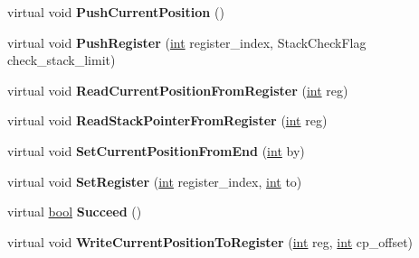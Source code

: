 \begin{DoxyCompactItemize}
virtual void {\bfseries Push\+Current\+Position} ()
\item 
\mbox{\label{classv8_1_1internal_1_1RegExpMacroAssemblerMIPS_a90366ef0b90e87e3abeadd215ac99101}} 
virtual void {\bfseries Push\+Register} (\mbox{\hyperlink{classint}{int}} register\+\_\+index, Stack\+Check\+Flag check\+\_\+stack\+\_\+limit)
\item 
\mbox{\label{classv8_1_1internal_1_1RegExpMacroAssemblerMIPS_a3db856debb66a86b0b999760078fc9e2}} 
virtual void {\bfseries Read\+Current\+Position\+From\+Register} (\mbox{\hyperlink{classint}{int}} reg)
\item 
\mbox{\label{classv8_1_1internal_1_1RegExpMacroAssemblerMIPS_a5f13f6d69555eafd3532f64d2ea443a0}} 
virtual void {\bfseries Read\+Stack\+Pointer\+From\+Register} (\mbox{\hyperlink{classint}{int}} reg)
\item 
\mbox{\label{classv8_1_1internal_1_1RegExpMacroAssemblerMIPS_a005d180b2c2a25be9adada6ceea905c7}} 
virtual void {\bfseries Set\+Current\+Position\+From\+End} (\mbox{\hyperlink{classint}{int}} by)
\item 
\mbox{\label{classv8_1_1internal_1_1RegExpMacroAssemblerMIPS_ace49e35921054598366cc061597be4ff}} 
virtual void {\bfseries Set\+Register} (\mbox{\hyperlink{classint}{int}} register\+\_\+index, \mbox{\hyperlink{classint}{int}} to)
\item 
\mbox{\label{classv8_1_1internal_1_1RegExpMacroAssemblerMIPS_a46808edf5f7a5f7ba71b8caedb66aa0a}} 
virtual \mbox{\hyperlink{classbool}{bool}} {\bfseries Succeed} ()
\item 
\mbox{\label{classv8_1_1internal_1_1RegExpMacroAssemblerMIPS_af342e57819b985ea254b8bcd994505e0}} 
virtual void {\bfseries Write\+Current\+Position\+To\+Register} (\mbox{\hyperlink{classint}{int}} reg, \mbox{\hyperlink{classint}{int}} cp\+\_\+offset)
\item 
\mbox{\label{classv8_1_1internal_1_1RegExpMacroAssemblerMIPS_ab12457b77455544117c217d04628a2d4}} 

\end{DoxyCompactItemize}
